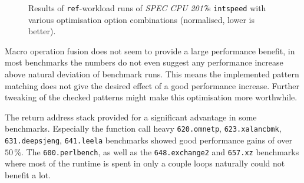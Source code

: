 \begin{figure}[h]
	\centering
	\caption[Translator optimisation evaluation results]%
	{Results of \texttt{ref}-workload runs of \textit{SPEC CPU 2017}s \texttt{intspeed} with various optimisation option combinations (normalised, lower is better).}
	\label{fig:opt-compare}
\end{figure}


Macro operation fusion does not seem to provide a large performance benefit, in most benchmarks the numbers do not even suggest any performance increase above natural deviation of benchmark runs.
This means the implemented pattern matching does not give the desired effect of a good performance increase.
Further tweaking of the checked patterns might make this optimisation more worthwhile.

The return address stack provided for a significant advantage in some benchmarks.
Especially the function call heavy \texttt{620.omnetp}, \texttt{623.xalancbmk}, \texttt{631.deepsjeng}, \texttt{641.leela} benchmarks showed good performance gains of over $50\,\%$.
The \texttt{600.perlbench}, as well as the \texttt{648.exchange2} and \texttt{657.xz} benchmarks where most of the runtime is spent in only a couple loops naturally could not benefit a lot.

